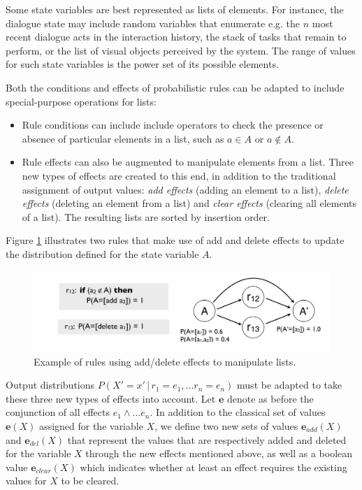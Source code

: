 Some state variables are best represented as lists of elements. For instance, the dialogue state may include random variables that enumerate e.g. the $n$ most recent dialogue acts in the interaction history, the stack of tasks that remain to perform, or the list of visual objects perceived by the system.  The range of values for such state variables is the power set of its possible elements. 

Both the conditions and effects of probabilistic rules can be adapted to include special-purpose operations for lists:
\begin{itemize}
\item Rule conditions can include include operators to check the presence or absence of particular elements in a list, such as $a \in A$ or $a \notin A$. 
\item Rule effects can also be augmented to manipulate elements from a list.  Three new types of effects are created to this end, in addition to the traditional assignment of output values: \textit{add effects} (adding an element to a list), \textit{delete effects} (deleting an element from a list) and \textit{clear effects} (clearing all elements of a list). The resulting lists are sorted by insertion order. 
\end{itemize}

Figure \ref{fig:seteffects} illustrates two rules that make use of add and delete effects to update the distribution defined for the state variable $A$. 
 
\begin{figure}[h]
\centering
\includegraphics[scale=0.25]{imgs/seteffects.pdf}
\caption{Example of rules using add/delete effects to manipulate lists.}
\label{fig:seteffects}
\end{figure}

Output distributions $P(X'\!=\!x' \, | \, r_1\!=\!e_1,... r_n\!=\!e_n)$ must be adapted to take  these three new types of effects into account.  Let $\mathbf{e}$ denote as before the conjunction of all effects $e_1 \land ... e_n$. In addition to the classical set of values $\mathbf{e}(X)$ assigned for the variable $X$, we define two new sets of values $\mathbf{e}_{add}(X)$ and $\mathbf{e}_{del}(X)$ that represent the values that are respectively added and deleted for the variable $X$ through the new effects mentioned above, as well as a boolean value $\mathbf{e}_{clear}(X)$ which indicates whether at least an effect requires the existing values for $X$ to be cleared.

